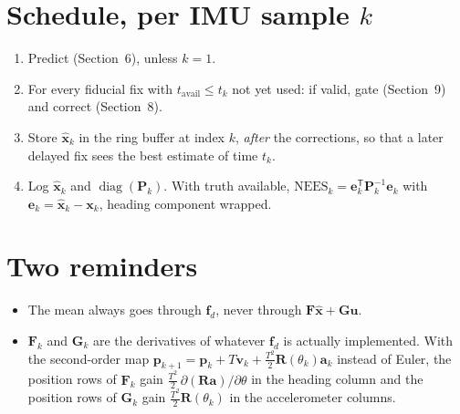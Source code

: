 \documentclass[11pt,a4paper]{article}
\newcommand{\vect}[1]{\bm{#1}}
\newcommand{\mat}[1]{\bm{#1}}
\newcommand{\T}{^{\mathsf{T}}}
\newcommand{\diag}{\operatorname{diag}}
\newcommand{\Rot}{\mat{R}}
\newcommand{\hx}{\hat{\vect{x}}}
\begin{document}
\section{Schedule, per IMU sample $k$}
\begin{enumerate}[nosep]
  \item Predict (Section~6), unless $k = 1$.
  \item For every fiducial fix with $t_{\mathrm{avail}} \le t_k$ not yet used: if valid, gate (Section~9) and correct (Section~8).
  \item Store $\hx_k$ in the ring buffer at index $k$, \emph{after} the corrections, so that a later delayed fix sees the best estimate of time $t_k$.
  \item Log $\hx_k$ and $\diag(\mat P_k)$. With truth available, $\mathrm{NEES}_k = \vect e_k\T\mat P_k^{-1}\vect e_k$ with $\vect e_k = \hx_k - \vect x_k$, heading component wrapped.
\end{enumerate}

\section*{Two reminders}
\begin{itemize}[nosep]
  \item The mean always goes through $\vect f_d$, never through $\mat F\hx + \mat G\vect u$.
  \item $\mat F_k$ and $\mat G_k$ are the derivatives of whatever $\vect f_d$ is actually implemented. With the second-order map $\vect p_{k+1} = \vect p_k + T\vect v_k + \tfrac{T^2}{2}\Rot(\theta_k)\vect a_k$ instead of Euler, the position rows of $\mat F_k$ gain $\tfrac{T^2}{2}\,\partial(\Rot\vect a)/\partial\theta$ in the heading column and the position rows of $\mat G_k$ gain $\tfrac{T^2}{2}\Rot(\theta_k)$ in the accelerometer columns.
\end{itemize}
\end{document}
